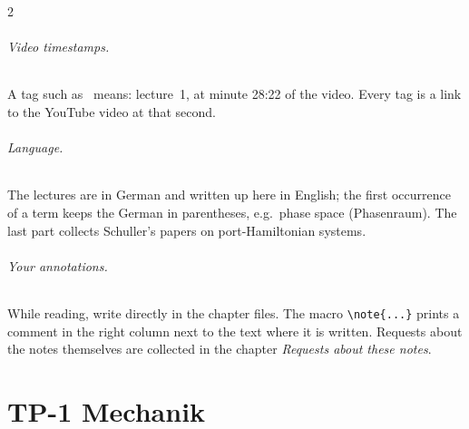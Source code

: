 \documentclass[12pt,oneside,openany]{book}
\begin{document}
\begin{paracol}{2}
\paragraph{Video timestamps.} A tag such as \ means: lecture~1, at minute 28:22 of the
video. Every tag is a link to the YouTube video at that second.

\paragraph{Language.} The lectures are in German and written up here in English; the first occurrence of a term keeps the German in parentheses, e.g.\ phase space (Phasenraum). The last part collects Schuller's papers on port-Hamiltonian systems.

\paragraph{Your annotations.} While reading, write directly in the chapter files. The macro
\verb|\note{...}| prints a comment in the right column next to the text where it is written. Requests
about the notes themselves are collected in the chapter \emph{Requests about these notes}.

\flushside
\end{paracol}



\tableofcontents

\mainmatter
\mainmatter
\part{TP-1 Mechanik}























\end{document}

